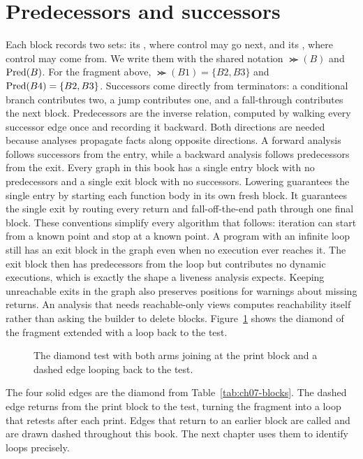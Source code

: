\section{Predecessors and successors}
\label{sec:ch07-pred-succ}

Each block records two sets: its , where control may go next, and its , where control may come from.
We write them with the shared notation $\Succ(B)$ and $\operatorname{Pred}(B)$.
For the fragment above, $\Succ(B1) = \{B2, B3\}$ and $\operatorname{Pred}(B4) = \{B2, B3\}$.
Successors come directly from terminators: a conditional branch contributes two, a jump contributes one, and a fall-through contributes the next block.
Predecessors are the inverse relation, computed by walking every successor edge once and recording it backward.
Both directions are needed because analyses propagate facts along opposite directions.
A forward analysis follows successors from the entry, while a backward analysis follows predecessors from the exit.
Every graph in this book has a single entry block with no predecessors and a single exit block with no successors.
Lowering guarantees the single entry by starting each function body in its own fresh block.
It guarantees the single exit by routing every return and fall-off-the-end path through one final block.
These conventions simplify every algorithm that follows: iteration can start from a known point and stop at a known point.
A program with an infinite loop still has an exit block in the graph even when no execution ever reaches it.
The exit block then has predecessors from the loop but contributes no dynamic executions, which is exactly the shape a liveness analysis expects.
Keeping unreachable exits in the graph also preserves positions for warnings about missing returns.
An analysis that needs reachable-only views computes reachability itself rather than asking the builder to delete blocks.
Figure~\ref{fig:ch07-diamond-loop} shows the diamond of the fragment extended with a loop back to the test.
\begin{figure}
\centering
{}
\caption{The diamond test with both arms joining at the print block and a dashed edge looping back to the test.}
\label{fig:ch07-diamond-loop}
\end{figure}
The four solid edges are the diamond from Table~\ref{tab:ch07-blocks}.
The dashed edge returns from the print block to the test, turning the fragment into a loop that retests after each print.
Edges that return to an earlier block are called  and are drawn dashed throughout this book.
The next chapter uses them to identify loops precisely.

